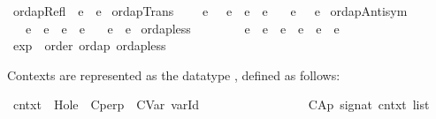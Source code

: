 \documentclass{llncs}
\newenvironment{isacode}
{\begin{list}{}{
\setlength{\leftmargin}{4pt}
\setlength{\rightmargin}{0pt}
\setlength{\listparindent}{0pt}\raggedright
\setlength{\itemsep}{0pt}
\setlength{\parsep}{0pt}
\normalfont\ttfamily }\item[]}
{\end{list}}
\begin{document}
\medskip

\begin{minipage}{\linewidth}
\begin{isacode}
\isamarkupfalse \ ordapRefl\ {\isacharcolon}\ {\isachardoublequoteopen}e\ {\isasymsqsubseteq}\ e{\isachardoublequoteclose}
 \isanewline
{}\isamarkupfalse \ ordapTrans\ {\isacharcolon}\isanewline
\ \ \ {\isachardoublequoteopen}e{}\ {\isasymsqsubseteq}\ \ e{}{\isachardoublequoteclose}\ \ {\isachardoublequoteopen}e{}\ {\isasymsqsubseteq}\ e{}{\isachardoublequoteclose}\isanewline
\ \ \ {\isachardoublequoteopen}e{}\ {\isasymsqsubseteq}\ \ e{}{\isachardoublequoteclose}
\isanewline
{}\isamarkupfalse \ ordapAntisym\ {\isacharcolon}\isanewline
\ \ \ {\isachardoublequoteopen}e{}\ {\isasymsqsubseteq}\ e{}{\isachardoublequoteclose}\ \ {\isachardoublequoteopen}e{}\ {\isasymsqsubseteq}\ e{}{\isachardoublequoteclose}\isanewline
\ \ \ {\isachardoublequoteopen}e{}\ {\isacharequal}\ e{}{\isachardoublequoteclose}\isanewline
{}\isamarkupfalse \ ordap{\isacharunderscore}less\ {\isacharparenleft}{\isachardoublequoteopen}{\isacharunderscore}\ {\isasymsqsubset}\ {\isacharunderscore}{\isachardoublequoteclose}\ {\isacharbrackleft}{}{}{\isacharcomma}{}{}{\isacharbrackright}\ {}{}{\isacharparenright}\ \isanewline
\ \ {\isachardoublequoteopen}e\ {\isasymsqsubset}\ e{\isacharprime}\ {\isasymequiv}\ e\ {\isasymsqsubseteq}\ e{\isacharprime}\ {\isasymand}\ e\ {\isasymnoteq}\ e{\isacharprime}{\isachardoublequoteclose}\isanewline
{}\isamarkupfalse \ exp\ {\isacharcolon}\ order\ {\isacharbrackleft}ordap\ ordap{\isacharunderscore}less{\isacharbrackright}\end{isacode}
\end{minipage}


\medskip

\noindent Contexts are represented as the datatype , defined as follows:


\medskip

\begin{minipage}{\linewidth}
\begin{isacode}
\isamarkupfalse \ cntxt\ {\isacharequal}\ Hole\ {\isacharbar}\ Cperp\ {\isacharbar}\ CVar\ varId\ \isanewline
\ \ \ \ \ \ \ \ \ \ \ \ \ \ \ {\isacharbar}\ CAp\ signat\ {\isachardoublequoteopen}cntxt\ list{\isachardoublequoteclose}\end{isacode}
\end{minipage}
\end{document}
